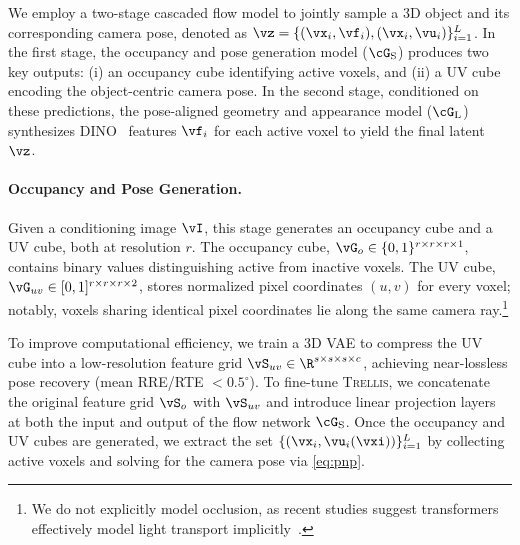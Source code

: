 \documentclass[../../book-main.tex]{subfiles}
\begin{document}
We employ a two-stage cascaded flow model to jointly sample a 3D object and its corresponding camera pose, denoted as \(\latent = \{ (\point_{i}, \feat_{i}), (\point_{i}, \pixcoord_{i}) \}_{i=1}^{\numpts}\).
In the first stage, the occupancy and pose generation model (\(\sflow\)) produces two key outputs: (i) an occupancy cube identifying active voxels, and (ii) a UV cube encoding the object-centric camera pose.
In the second stage, conditioned on these predictions, the pose-aligned geometry and appearance model (\(\lflow\)) synthesizes DINO~\citep{oquab2023dinov2} features \(\feat_{i}\) for each active voxel to yield the final latent \(\latent\).

\paragraph{Occupancy and Pose Generation.}
Given a conditioning image \(\image\), this stage generates an occupancy cube and a UV cube, both at resolution \(r\).
The occupancy cube, \(\vG_{o} \in \{0, 1\}^{r \times r \times r \times 1}\), contains binary values distinguishing active from inactive voxels.
The UV cube, \(\vG_{uv} \in [0, 1]^{r \times r \times r \times 2}\), stores normalized pixel coordinates \((u, v)\) for every voxel;
notably, voxels sharing identical pixel coordinates lie along the same camera ray.\footnote{We do not explicitly model occlusion, as recent studies suggest transformers effectively model light transport implicitly~\citep{jin2024lvsm, zeng2025renderformer}.}

To improve computational efficiency, we train a 3D VAE to compress the UV cube into a low-resolution feature grid \(\vS_{uv} \in \R^{s \times s \times s \times c}\), achieving near-lossless pose recovery (mean RRE/RTE \(< 0.5^\circ\)).
To fine-tune \textsc{Trellis}, we concatenate the original feature grid \(\vS_{o}\) with \(\vS_{uv}\) and introduce linear projection layers at both the input and output of the flow network \(\sflow\).
Once the occupancy and UV cubes are generated, we extract the set \(\{ (\point_{i}, \pixcoord_{i}(\pose)) \}_{i=1}^{\numpts}\) by collecting active voxels and solving for the camera pose via \eqref{eq:pnp}.
\end{document}
